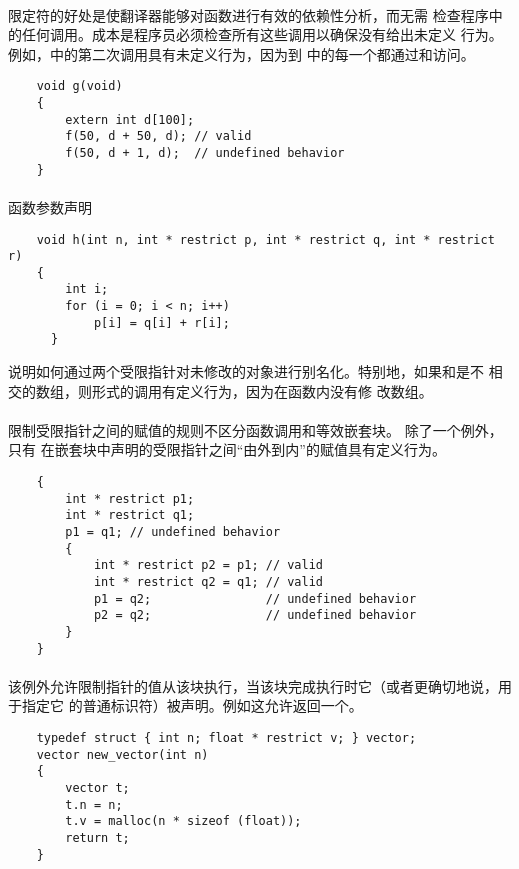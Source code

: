 \paragraph{}
限定符的好处是使翻译器能够对函数进行有效的依赖性分析，而无需
检查程序中的任何调用。成本是程序员必须检查所有这些调用以确保没有给出未定义
行为。例如，中的第二次调用具有未定义行为，因为到
中的每一个都通过和访问。
\begin{lstlisting}
    void g(void)
    {
        extern int d[100];
        f(50, d + 50, d); // valid
        f(50, d + 1, d);  // undefined behavior
    }
\end{lstlisting}

\paragraph{}
\ex 函数参数声明
\begin{lstlisting}
    void h(int n, int * restrict p, int * restrict q, int * restrict r)
    {
        int i;
        for (i = 0; i < n; i++)
            p[i] = q[i] + r[i];
      }
\end{lstlisting}
说明如何通过两个受限指针对未修改的对象进行别名化。特别地，如果和是不
相交的数组，则形式的调用有定义行为，因为在函数内没有修
改数组。

\paragraph{}
\ex 限制受限指针之间的赋值的规则不区分函数调用和等效嵌套块。 除了一个例外，只有
在嵌套块中声明的受限指针之间``由外到内''的赋值具有定义行为。
\begin{lstlisting}
    {
        int * restrict p1;
        int * restrict q1;
        p1 = q1; // undefined behavior
        {
            int * restrict p2 = p1; // valid
            int * restrict q2 = q1; // valid
            p1 = q2;                // undefined behavior
            p2 = q2;                // undefined behavior
        }
    }
\end{lstlisting}

\paragraph{}
该例外允许限制指针的值从该块执行，当该块完成执行时它（或者更确切地说，用于指定它
的普通标识符）被声明。例如这允许返回一个。
\begin{lstlisting}
    typedef struct { int n; float * restrict v; } vector;
    vector new_vector(int n)
    {
        vector t;
        t.n = n;
        t.v = malloc(n * sizeof (float));
        return t;
    }
\end{lstlisting}

